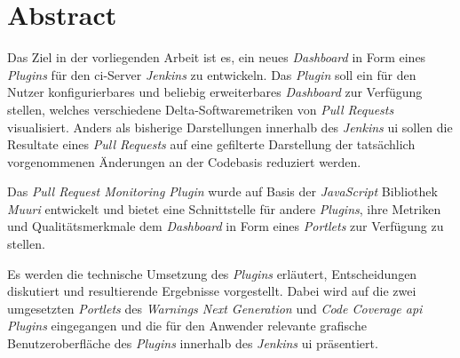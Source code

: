 \chapter{Abstract}
\label{Abstract}

Das Ziel in der vorliegenden Arbeit ist es, ein neues \textit{Dashboard} in Form eines \textit{Plugins} für den \acs{ci}-Server \textit{Jenkins} zu entwickeln. Das \textit{Plugin} soll ein für den Nutzer konfigurierbares und beliebig erweiterbares \textit{Dashboard} zur Verfügung stellen, welches verschiedene Delta-Softwaremetriken von \textit{Pull Requests} visualisiert. Anders als bisherige Darstellungen innerhalb des \textit{Jenkins} \acs{ui} sollen die Resultate eines \textit{Pull Requests} auf eine gefilterte Darstellung der tatsächlich vorgenommenen Änderungen an der Codebasis reduziert werden. 
 
Das \textit{Pull Request Monitoring Plugin} wurde auf Basis der \textit{JavaScript} Bibliothek \textit{Muuri} entwickelt und bietet eine Schnittstelle für andere \textit{Plugins}, ihre Metriken und Qualitätsmerkmale dem \textit{Dashboard} in Form eines \textit{Portlets} zur Verfügung zu stellen.

Es werden die technische Umsetzung des \textit{Plugins} erläutert, Entscheidungen diskutiert und resultierende Ergebnisse vorgestellt. Dabei wird auf die zwei umgesetzten \textit{Portlets} des \textit{Warnings Next Generation} und \textit{Code Coverage \acs{api}} \textit{Plugins} eingegangen und die für den Anwender relevante grafische Benutzer\-oberfläche des \textit{Plugins} innerhalb des \textit{Jenkins} \acs{ui} präsentiert. 
